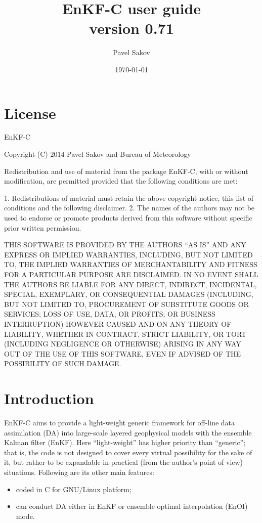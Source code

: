 \documentclass[11pt]{report}
\begin{document}

\title{EnKF-C user guide\\{\normalsize version 0.71}}

\author{Pavel Sakov}
\date{\today}

\maketitle
\thispagestyle{empty}

\clearpage

\tableofcontents

\clearpage

\chapter*{License}

EnKF-C

Copyright (C) 2014 Pavel Sakov and Bureau of Meteorology

Redistribution and use of material from the package EnKF-C, with or without
modification, are permitted provided that the following conditions are 
met:

   1. Redistributions of material must retain the above copyright notice, this
      list of conditions and the following disclaimer.
   2. The names of the authors may not be used to endorse or promote products
      derived from this software without specific prior written permission.

THIS SOFTWARE IS PROVIDED BY THE AUTHORS ``AS IS'' AND ANY EXPRESS OR IMPLIED 
WARRANTIES, INCLUDING, BUT NOT LIMITED TO, THE IMPLIED WARRANTIES OF
MERCHANTABILITY AND FITNESS FOR A PARTICULAR PURPOSE ARE DISCLAIMED. IN NO
EVENT SHALL THE AUTHORS BE LIABLE FOR ANY DIRECT, INDIRECT, INCIDENTAL, SPECIAL,
EXEMPLARY, OR CONSEQUENTIAL DAMAGES (INCLUDING, BUT NOT LIMITED TO, PROCUREMENT
OF SUBSTITUTE GOODS OR SERVICES; LOSS OF USE, DATA, OR PROFITS; OR BUSINESS
INTERRUPTION) HOWEVER CAUSED AND ON ANY THEORY OF LIABILITY, WHETHER IN
CONTRACT, STRICT LIABILITY, OR TORT (INCLUDING NEGLIGENCE OR OTHERWISE) ARISING
IN ANY WAY OUT OF THE USE OF THIS SOFTWARE, EVEN IF ADVISED OF THE POSSIBILITY
OF SUCH DAMAGE.

\chapter{Introduction}

EnKF-C aims to provide a light-weight generic framework for off-line data assimilation (DA) into large-scale layered geophysical models with the ensemble Kalman filter (EnKF).
Here ``light-weight'' has higher priority than ``generic''; that is, the code is not designed to cover every virtual possibility for the sake of it, but rather to be expandable in practical (from the author's point of view) situations.
Following are its other main features:
\begin{itemize}
\item coded in C for GNU/Linux platform;
\item can conduct DA either in EnKF or ensemble optimal interpolation (EnOI) mode.
\end{itemize}
\end{document}
